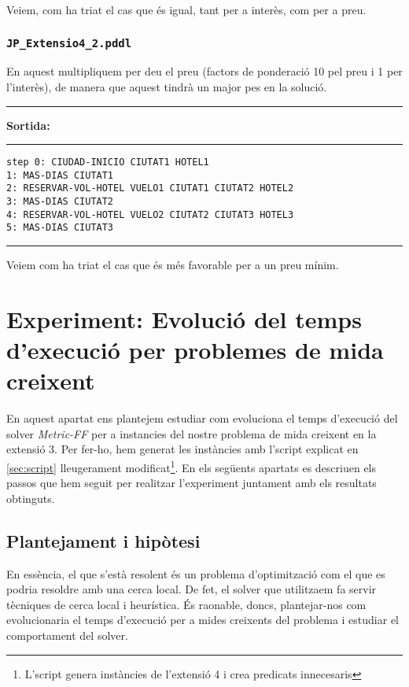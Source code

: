 \documentclass[11pt,a4paper]{article}
\begin{document}
Veiem, com ha triat el cas que és igual, tant per a interès, com per a preu.

\subsubsection*{\texttt{JP\_Extensio4\_2.pddl}}

En aquest multipliquem per deu el preu (factors de ponderació 10 pel preu i 1 per l'interès), de manera que aquest tindrà un major pes en la solució.

\begin{samepage}
\medskip
\noindent
\rule{0.1\textwidth}{0.5mm}
\textbf{Sortida:}
\rule{0.76\textwidth}{0.5mm}
\begin{verbatim}
step 0: CIUDAD-INICIO CIUTAT1 HOTEL1
1: MAS-DIAS CIUTAT1
2: RESERVAR-VOL-HOTEL VUELO1 CIUTAT1 CIUTAT2 HOTEL2
3: MAS-DIAS CIUTAT2
4: RESERVAR-VOL-HOTEL VUELO2 CIUTAT2 CIUTAT3 HOTEL3
5: MAS-DIAS CIUTAT3
\end{verbatim}
\rule{\textwidth}{0.5mm}
\medskip
\end{samepage}

Veiem com ha triat el cas que és més favorable per a un preu mínim.

\section[Experiment extra]{Experiment: Evolució del temps d'execució per problemes de mida creixent}
\label{sec:experiment}

En aquest apartat ens plantejem estudiar com evoluciona el temps d'execució del solver \emph{Metric-FF} per a instancies del nostre problema de mida creixent en la extensió 3. Per fer-ho, hem generat les instàncies amb l'script explicat en \ref{sec:script} lleugerament modificat\footnote{L'script genera instàncies de l'extensió 4 i crea predicats innecesaris}. En els següents apartats es descriuen els passos que hem seguit per realitzar l'experiment juntament amb els resultats obtinguts.

\subsection{Plantejament i hipòtesi}

En essència, el que s'està resolent és un problema d'optimització com el que es podria resoldre amb una cerca local. De fet, el solver que utilitzaem fa servir tècniques de cerca local i heurística. És raonable, doncs, plantejar-nos com evolucionaria el temps d'execució per a mides creixents del problema i estudiar el comportament del solver. 
\end{document}
